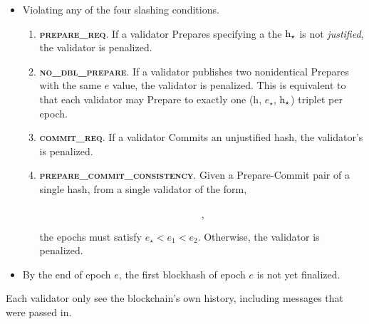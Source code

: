 \documentclass[12pt, final]{article}
\newcommand{\epoch}{\ensuremath{e}\xspace}
\newcommand{\hash}{\textnormal{h}\xspace}
\newcommand{\hashsource}{\ensuremath{\hash_{\star}}\xspace}
\newcommand{\epochsource}{\ensuremath{\epoch_{\star}}\xspace}
\newcommand{\signature}{\ensuremath{\mathcal{S}}\xspace}
\newcommand{\msgPREPARE}{\textbf{\textsc{prepare}}\xspace}
\newcommand{\msgCOMMIT}{\textbf{\textsc{commit}}\xspace}
\begin{document}
\begin{itemize}
\item Violating any of the four slashing conditions. \cite{minslashing}
\begin{enumerate}
    \item \textbf{\textsc{prepare\_req}}. If a validator Prepares specifying a the $\hashsource$ is not \emph{justified}, the validator is penalized.

    \item \textbf{\textsc{no\_dbl\_prepare}}. If a validator publishes two nonidentical Prepares with the same $\epoch$ value, the validator is penalized.  This is equivalent to that each validator may Prepare to exactly one (\hash, \epochsource, \hashsource) triplet per epoch.

    \item \textbf{\textsc{commit\_req}}. If a validator Commits an unjustified hash, the validator's is penalized.

    \item \textbf{\textsc{prepare\_commit\_consistency}}. Given a Prepare-Commit pair of a single hash, from a single validator of the form,

\begin{equation*}
[\msgPREPARE, \epoch_1, \hash, \epochsource, \hashsource, \signature]
\label{eq:msgPREPARE}
\end{equation*}

\begin{equation*}
[\msgCOMMIT, \epoch_2, \hash, \signature] \;, 
\label{eq:msgCOMMIT}
\end{equation*}

the epochs must satisfy $\epochsource < \epoch_1 < \epoch_2$.  Otherwise, the validator is penalized.
     
\end{enumerate}
\item By the end of epoch \epoch, the first blockhash of epoch \epoch is not yet finalized.
\end{itemize}

Each validator only see the blockchain's own history, including messages that were passed in. 
\end{document}
